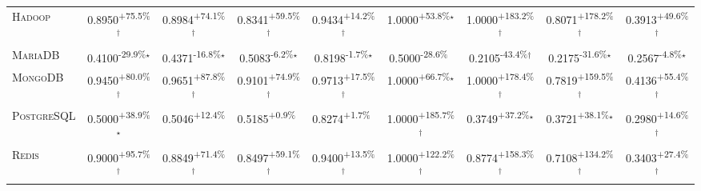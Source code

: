 \begin{table}[htbp]
\begin{tabular}{l|cccc|cccc}
\textsc{Hadoop} & \cellcolor{green!30}0.8950\textsuperscript{+75.5\%}$^\dagger$ & \cellcolor{green!30}0.8984\textsuperscript{+74.1\%}$^\dagger$ & \cellcolor{green!30}0.8341\textsuperscript{+59.5\%}$^\dagger$ & \cellcolor{green!30}0.9434\textsuperscript{+14.2\%}$^\dagger$ & \cellcolor{green!30}1.0000\textsuperscript{+53.8\%}$^\star$ & \cellcolor{green!30}1.0000\textsuperscript{+183.2\%}$^\dagger$ & \cellcolor{green!30}0.8071\textsuperscript{+178.2\%}$^\dagger$ & \cellcolor{green!30}0.3913\textsuperscript{+49.6\%}$^\dagger$ \\
\textsc{MariaDB} & \cellcolor{red!30}0.4100\textsuperscript{-29.9\%}$^\star$ & \cellcolor{red!30}0.4371\textsuperscript{-16.8\%}$^\star$ & \cellcolor{red!30}0.5083\textsuperscript{-6.2\%}$^\star$ & \cellcolor{red!30}0.8198\textsuperscript{-1.7\%}$^\star$ & \cellcolor{red!30}0.5000\textsuperscript{-28.6\%}$^{\,\,\,}$ & \cellcolor{red!30}0.2105\textsuperscript{-43.4\%}$^\dagger$ & \cellcolor{red!30}0.2175\textsuperscript{-31.6\%}$^\star$ & \cellcolor{red!30}0.2567\textsuperscript{-4.8\%}$^\star$ \\
\textsc{MongoDB} & \cellcolor{green!30}0.9450\textsuperscript{+80.0\%}$^\dagger$ & \cellcolor{green!30}0.9651\textsuperscript{+87.8\%}$^\dagger$ & \cellcolor{green!30}0.9101\textsuperscript{+74.9\%}$^\dagger$ & \cellcolor{green!30}0.9713\textsuperscript{+17.5\%}$^\dagger$ & \cellcolor{green!30}1.0000\textsuperscript{+66.7\%}$^\star$ & \cellcolor{green!30}1.0000\textsuperscript{+178.4\%}$^\dagger$ & \cellcolor{green!30}0.7819\textsuperscript{+159.5\%}$^\dagger$ & \cellcolor{green!30}0.4136\textsuperscript{+55.4\%}$^\dagger$ \\
\textsc{PostgreSQL} & \cellcolor{green!30}0.5000\textsuperscript{+38.9\%}$^\star$ & \cellcolor{green!30}0.5046\textsuperscript{+12.4\%}$^{\,\,\,}$ & \cellcolor{green!30}0.5185\textsuperscript{+0.9\%}$^{\,\,\,}$ & \cellcolor{green!30}0.8274\textsuperscript{+1.7\%}$^{\,\,\,}$ & \cellcolor{green!30}1.0000\textsuperscript{+185.7\%}$^\dagger$ & \cellcolor{green!30}0.3749\textsuperscript{+37.2\%}$^\star$ & \cellcolor{green!30}0.3721\textsuperscript{+38.1\%}$^\star$ & \cellcolor{green!30}0.2980\textsuperscript{+14.6\%}$^\dagger$ \\
\textsc{Redis} & \cellcolor{green!30}0.9000\textsuperscript{+95.7\%}$^\dagger$ & \cellcolor{green!30}0.8849\textsuperscript{+71.4\%}$^\dagger$ & \cellcolor{green!30}0.8497\textsuperscript{+59.1\%}$^\dagger$ & \cellcolor{green!30}0.9400\textsuperscript{+13.5\%}$^\dagger$ & \cellcolor{green!30}1.0000\textsuperscript{+122.2\%}$^\dagger$ & \cellcolor{green!30}0.8774\textsuperscript{+158.3\%}$^\dagger$ & \cellcolor{green!30}0.7108\textsuperscript{+134.2\%}$^\dagger$ & \cellcolor{green!30}0.3403\textsuperscript{+27.4\%}$^\dagger$ \\

\end{tabular}
\end{table}
